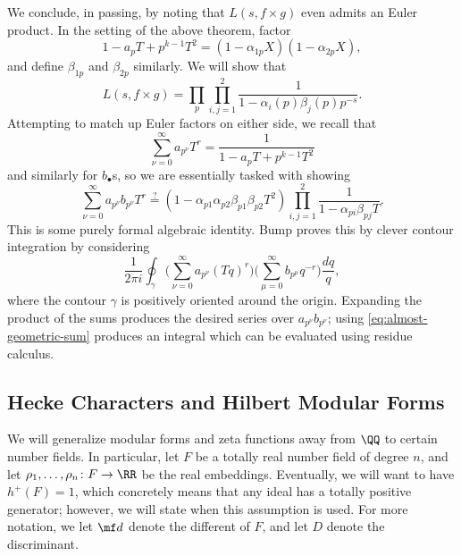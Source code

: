 \documentclass{article}
\begin{document}
We conclude, in passing, by noting that $L(s,f\times g)$ even admits an Euler product. In the setting of the above theorem, factor
\[1-a_pT+p^{k-1}T^2=\left(1-\alpha_{1p}X\right)\left(1-\alpha_{2p}X\right),\]
and define $\beta_{1p}$ and $\beta_{2p}$ similarly. We will show that
\[L(s,f\times g)=\prod_p\prod_{i,j=1}^2\frac1{1-\alpha_i(p)\beta_j(p)p^{-s}}.\]
Attempting to match up Euler factors on either side, we recall that
\begin{equation}
	\sum_{\nu=0}^\infty a_{p^\nu}T^r=\frac1{1-a_pT+p^{k-1}T^2} \label{eq:almost-geometric-sum}
\end{equation}
and similarly for $b_\bullet$s, so we are essentially tasked with showing
\[\sum_{\nu=0}^\infty a_{p^\nu}b_{p^\nu}T^r\stackrel?=\left(1-\alpha_{p1}\alpha_{p2}\beta_{p1}\beta_{p2}T^2\right)\prod_{i,j=1}^2\frac1{1-\alpha_{pi}\beta_{pj}T}.\]
This is some purely formal algebraic identity. Bump proves this by clever contour integration by considering
\[\frac1{2\pi i}\oint_\gamma\Bigg(\sum_{\nu=0}^\infty a_{p^\nu}(Tq)^r\Bigg)\Bigg(\sum_{\mu=0}^\infty b_{p^\mu}q^{-r}\Bigg)\frac{dq}q,\]
where the contour $\gamma$ is positively oriented around the origin. Expanding the product of the sums produces the desired series over $a_{p^\nu}b_{p^\nu}$; using \eqref{eq:almost-geometric-sum} produces an integral which can be evaluated using residue calculus.

\subsection{Hecke Characters and Hilbert Modular Forms}
We will generalize modular forms and zeta functions away from $\QQ$ to certain number fields. In particular, let $F$ be a totally real number field of degree $n$, and let $\rho_1,\ldots,\rho_n\colon F\to\RR$ be the real embeddings. Eventually, we will want to have $h^+(F)=1$, which concretely means that any ideal has a totally positive generator; however, we will state when this assumption is used. For more notation, we let $\mf d$ denote the different of $F$, and let $D$ denote the discriminant.
\end{document}
